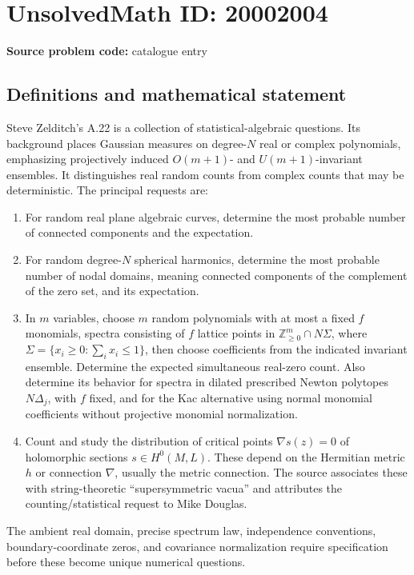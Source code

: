 \documentclass[11pt]{article}
\newcommand{\Z}{\mathbb{Z}}
\begin{document}
\section*{UnsolvedMath ID: 20002004}
\textbf{Source problem code:} catalogue entry
\subsection{Definitions and mathematical statement}
Steve Zelditch's A.22 is a collection of statistical-algebraic questions. Its background places Gaussian measures on degree-\(N\) real or complex polynomials, emphasizing projectively induced \(O(m+1)\)- and \(U(m+1)\)-invariant ensembles. It distinguishes real random counts from complex counts that may be deterministic. The principal requests are:
\begin{enumerate}
\item For random real plane algebraic curves, determine the most probable number of connected components and the expectation.
\item For random degree-\(N\) spherical harmonics, determine the most probable number of nodal domains, meaning connected components of the complement of the zero set, and its expectation.
\item In \(m\) variables, choose \(m\) random polynomials with at most a fixed \(f\) monomials, spectra consisting of \(f\) lattice points in \(\Z_{\ge0}^m\cap N\Sigma\), where \(\Sigma=\{x_i\ge0:\sum_i x_i\le1\}\), then choose coefficients from the indicated invariant ensemble. Determine the expected simultaneous real-zero count. Also determine its behavior for spectra in dilated prescribed Newton polytopes \(N\Delta_j\), with \(f\) fixed, and for the Kac alternative using normal monomial coefficients without projective monomial normalization.
\item Count and study the distribution of critical points \(\nabla s(z)=0\) of holomorphic sections \(s\in H^0(M,L)\). These depend on the Hermitian metric \(h\) or connection \(\nabla\), usually the metric connection. The source associates these with string-theoretic ``supersymmetric vacua'' and attributes the counting/statistical request to Mike Douglas.
\end{enumerate}
The ambient real domain, precise spectrum law, independence conventions, boundary-coordinate zeros, and covariance normalization require specification before these become unique numerical questions.
\end{document}
